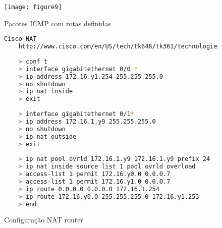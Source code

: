 \begin{figure}[ht]
	\texttt{[image: figure9]}                                                      
    \caption{Pacotes ICMP com rotas definidas}
    \label{fig:fig9}
\end{figure}

\begin{figure}[ht]
	\begin{lstlisting}[language=bash]
	Cisco NAT
	http://www.cisco.com/en/US/tech/tk648/tk361/technologies_tech_note09186a0080094e77.shtml
	
	> conf t
	> interface gigabitethernet 0/0 *
	> ip address 172.16.y1.254 255.255.255.0
	> no shutdown
	> ip nat inside
	> exit
	
	> interface gigabitethernet 0/1*
	> ip address 172.16.1.y9 255.255.255.0
	> no shutdown
	> ip nat outside
	> exit
	
	> ip nat pool ovrld 172.16.1.y9 172.16.1.y9 prefix 24
	> ip nat inside source list 1 pool ovrld overload
	> access-list 1 permit 172.16.y0.0 0.0.0.7
	> access-list 1 permit 172.16.y1.0 0.0.0.7
	> ip route 0.0.0.0 0.0.0.0 172.16.1.254
	> ip route 172.16.y0.0 255.255.255.0 172.16.y1.253
	> end
	\end{lstlisting}
    \caption{Configuração NAT router}
    \label{fig:fig10}
\end{figure}


